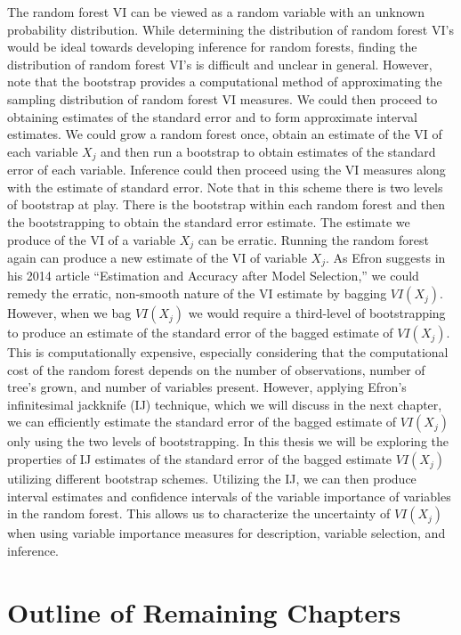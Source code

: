 \documentclass[12pt,twoside]{reedthesis}
\theoremstyle{definition}
\theoremstyle{definition}
\theoremstyle{definition}
\theoremstyle{remark}
\begin{document}
The random forest VI can be viewed as a random variable with an unknown
probability distribution. While determining the distribution of random
forest VI's would be ideal towards developing inference for random
forests, finding the distribution of random forest VI's is difficult and
unclear in general. However, note that the bootstrap provides a
computational method of approximating the sampling distribution of
random forest VI measures. We could then proceed to obtaining estimates
of the standard error and to form approximate interval estimates. We
could grow a random forest once, obtain an estimate of the VI of each
variable \(X_j\) and then run a bootstrap to obtain estimates of the
standard error of each variable. Inference could then proceed using the
VI measures along with the estimate of standard error. Note that in this
scheme there is two levels of bootstrap at play. There is the bootstrap
within each random forest and then the bootstrapping to obtain the
standard error estimate. The estimate we produce of the VI of a variable
\(X_j\) can be erratic. Running the random forest again can produce a
new estimate of the VI of variable \(X_j\). As Efron suggests in his
2014 article ``Estimation and Accuracy after Model Selection,'' we could
remedy the erratic, non-smooth nature of the VI estimate by bagging
\(VI(X_j)\). However, when we bag \(VI(X_j)\) we would require a
third-level of bootstrapping to produce an estimate of the standard
error of the bagged estimate of \(VI(X_j)\). This is computationally
expensive, especially considering that the computational cost of the
random forest depends on the number of observations, number of tree's
grown, and number of variables present. However, applying Efron's
infinitesimal jackknife (IJ) technique, which we will discuss in the
next chapter, we can efficiently estimate the standard error of the
bagged estimate of \(VI(X_j)\) only using the two levels of
bootstrapping. In this thesis we will be exploring the properties of IJ
estimates of the standard error of the bagged estimate \(VI(X_j)\)
utilizing different bootstrap schemes. Utilizing the IJ, we can then
produce interval estimates and confidence intervals of the variable
importance of variables in the random forest. This allows us to
characterize the uncertainty of \(VI(X_j)\) when using variable
importance measures for description, variable selection, and inference.

\section{Outline of Remaining
Chapters}\label{outline-of-remaining-chapters}
\end{document}
